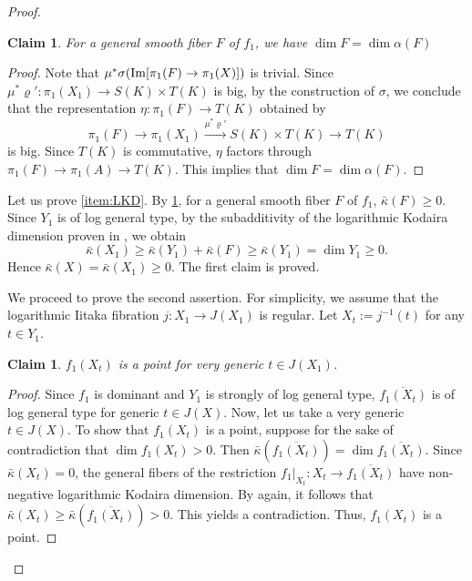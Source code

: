 \documentclass[english]{amsproc}
\theoremstyle{plain}
\newtheorem{claim}[thm]{Claim}
\theoremstyle{definition}
\theoremstyle{remark}
\theoremstyle{plain}
\numberwithin{equation}{thm} %
\begin{document}
\begin{proof}
			
		 	\begin{claim}\label{claim:same}
		 		For a general smooth fiber $F$ of $f_1$,  	we have	  $\dim F=\dim \alpha(F)$
	 	\end{claim}
		 \begin{proof}
			Note that $\mu^*\sigma({\rm Im}[\pi_1(F)\to \pi_1(X)])$ is trivial. Since $\mu^*\varrho':\pi_1(X_1)\to S(K)\times T(K)$ is big, by the construction of $\sigma$, we conclude that the representation $\eta:\pi_1(F)\to T(K)$ obtained by 
				$$
				\pi_1(F)\to \pi_1(X_1)\stackrel{\mu^*\varrho'}{\to}  S(K)\times T(K)\to T(K)
				$$ 
				is big.  Since $T(K)$ is commutative,  $\eta$ factors through $\pi_1(F)\to \pi_1(A)\to T(K)$. This implies that $\dim F=\dim \alpha(F)$. %
		 	\end{proof}
			
			
			
			
			
			Let us  prove \cref{item:LKD}.  
		By \cref{claim:same}, for a    general smooth fiber $F$ of $f_1$, $\bar{\kappa}(F)\geq 0$. Since $Y_1$ is of log general type, by the  subadditivity of the logarithmic Kodaira dimension  proven in \cite[Theorem 1.9]{Fuj17}, we obtain $$\bar{\kappa}(X_1)\geq \bar{\kappa}(Y_1)+\bar{\kappa}(F)\geq \bar{\kappa}(Y_1)=\dim Y_1\geq 0.$$  
			Hence $\bar{\kappa}(X)=\bar{\kappa}(X_1)\geq 0$. 
			The first claim is proved. 
			
			
			
			
			\medspace
			 
			
			We proceed to prove the second assertion. For simplicity, we assume that the logarithmic Iitaka fibration $j:X_1\to J(X_1)$ is regular. Let $X_t:=j^{-1}(t)$ for any $t\in Y_1$. 
			\begin{claim}\label{claim:20230518}
				$f_1(X_t)$ is a point for very generic $t\in J(X_1)$.
			\end{claim} 
			\begin{proof}
				Since $f_1$ is dominant and $Y_1$ is strongly of log general type, $\overline{f_1(X_t)}$ is of log general type for generic $t\in J(X)$.
				Now, let us take a very generic $t\in J(X)$.
				To show that $f_1(X_t)$ is a point, suppose for the sake of contradiction that $\dim f_1(X_t)>0$.
				Then $\bar{\kappa}(\overline{f_1(X_t)})=\dim \overline{f_1(X_t)}$.
				Since $\bar{\kappa}(X_t)=0$, the general fibers of the restriction $f_1|_{X_t}:X_t\to \overline{f_1(X_t)}$ have non-negative logarithmic Kodaira dimension. By \cite[Theorem 1.9]{Fuj17} again, it follows that $\bar{\kappa}(X_t)\geq \bar{\kappa}(\overline{f_1(X_t)})>0$. This yields a contradiction.
				Thus, $f_1(X_t)$ is a point.
			\end{proof}
			

\end{proof}
\end{document}
